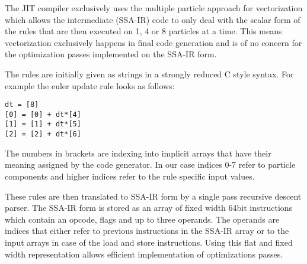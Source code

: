 The JIT compiler exclusively uses the multiple particle approach for vectorization which allows the intermediate (SSA-IR) code to only deal with the scalar form of the rules that are then executed on 1, 4 or 8 particles at a time. This means vectorization exclusively happens in final code generation and is of no concern for the optimization passes implemented on the SSA-IR form.

The rules are initially given as strings in a strongly reduced C style syntax. For example the euler update rule looks as follows:

\noindent\begin{minipage}{\linewidth}
\begin{lstlisting}
dt = [8]
[0] = [0] + dt*[4]
[1] = [1] + dt*[5]
[2] = [2] + dt*[6]
\end{lstlisting}
\end{minipage}

The numbers in brackets are indexing into implicit arrays that have their meaning assigned by the code generator. In our case indices 0-7 refer to particle components and higher indices refer to the rule specific input values.

These rules are then translated to SSA-IR form by a single pass recursive descent parser. The SSA-IR form is stored as an array of fixed width 64bit instructions which contain an opcode, flags and up to three operands. The operands are indices that either refer to previous instructions in the SSA-IR array or to the input arrays in case of the load and store instructions. Using this flat and fixed width representation allows efficient implementation of optimizations passes.


